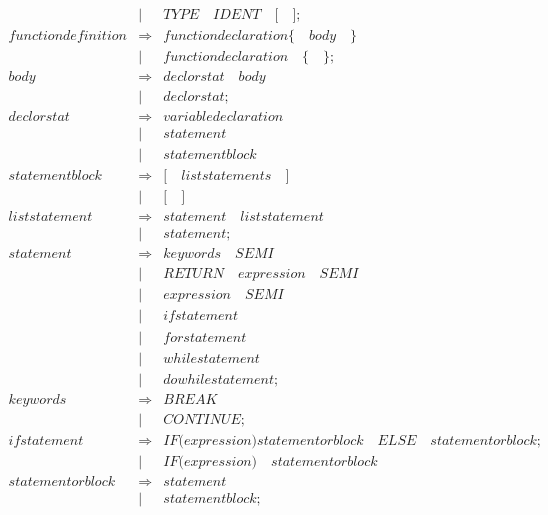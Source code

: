 \documentclass{article}
\begin{document}
\begin{eqnarray}
   & | & \mathit{TYPE} \quad \mathit{IDENT} \quad \mathit{[} \quad \mathit{]} ; \\
   \mathit{functiondefinition} & \Rightarrow & \mathit{functiondeclaration} \mathit{\{}\quad \mathit{body}  \quad \mathit{\}}  \\
   & | & \mathit{functiondeclaration} \quad \mathit{\{} \quad \mathit{\}} ;  \\
   \mathit{body} & \Rightarrow & \mathit{declorstat} \quad \mathit{body} \\
   & | & \mathit{declorstat} ; \\
   \mathit{declorstat} & \Rightarrow & \mathit{variabledeclaration} \\
   & | & \mathit{statement}\\
   & | & \mathit{statementblock} \\
   \mathit{statementblock} & \Rightarrow & \mathit{[} \quad \mathit{liststatements} \quad \mathit{]}\\
   & | & \mathit{[} \quad \mathit{]}\\
   \mathit{liststatement} & \Rightarrow & \mathit{statement} \quad \mathit{liststatement} \\
   & | & \mathit{statement} ; \\
   \mathit{statement} & \Rightarrow & \mathit{keywords} \quad \mathit{SEMI}\\
   & | & \mathit{RETURN} \quad \mathit{expression} \quad \mathit{SEMI}\\
   & | & \mathit{expression} \quad \mathit{SEMI} \\
   & | & \mathit{ifstatement} \\
   & | & \mathit{forstatement} \\
   & | & \mathit{whilestatement} \\
   & | & \mathit{dowhilestatement} ;\\
   \mathit{keywords} & \Rightarrow & \mathit{BREAK} \\
   & | & \mathit{CONTINUE};\\
   \mathit{ifstatement} & \Rightarrow & \mathit{IF} \mathit{(} \mathit{expression} \mathit{)} \mathit{statementorblock} \quad \mathit{ELSE} \quad \mathit{statementorblock} ;\\
   & | & \mathit{IF} \mathit{(} \mathit{expression} \mathit{)} \quad \mathit{statementorblock} \\
   \mathit{statementorblock} & \Rightarrow & \mathit{statement} \\
   &| & \mathit{statementblock};\\

\end{eqnarray}
\end{document}
